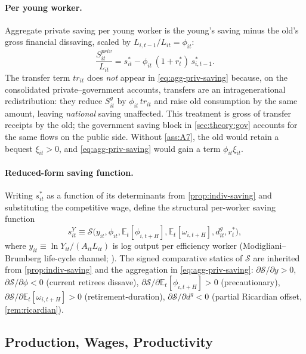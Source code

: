 \paragraph{Per young worker.} Aggregate private saving per young worker is the
young's saving minus the old's gross financial dissaving, scaled by $L_{i,t-1}/L_{it}=\phi_{it}$:
\begin{equation}
\frac{S_{it}^{priv}}{L_{it}}=s_{it}^*-\phi_{it}\,(1+r_t^*)\,s_{i,t-1}^*.
\label{eq:agg-priv-saving}
\end{equation}
The transfer term $tr_{it}$ does \emph{not} appear in \eqref{eq:agg-priv-saving}
because, on the consolidated private--government accounts, transfers are an
intragenerational redistribution: they reduce $S_{it}^g$ by $\phi_{it}\,tr_{it}$
and raise old consumption by the same amount, leaving \emph{national} saving
unaffected. This treatment is gross of transfer receipts by the old; the
government saving block in \cref{sec:theory:gov} accounts for the same flows
on the public side. Without \cref{ass:A7}, the old would retain a bequest
$\xi_{it}>0$, and \eqref{eq:agg-priv-saving} would gain a term
$\phi_{it}\xi_{it}$.

\paragraph{Reduced-form saving function.} Writing $s_{it}^*$ as a function of
its determinants from \cref{prop:indiv-saving} and substituting the competitive
wage, define the structural per-worker saving function
\begin{equation}
s_{it}^Y\equiv\mathcal{S}\bigl(y_{it},\phi_{it},\mathbb{E}_t[\phi_{i,t+H}],\mathbb{E}_t[\omega_{i,t+H}],d_{it}^g,r_t^*\bigr),
\label{eq:S-function}
\end{equation}
where $y_{it}\equiv \ln Y_{it}/(A_{it}L_{it})$ is log output per efficiency
worker (Modigliani--Brumberg life-cycle channel; \citealp{ModiglianiBrumberg1954,Feldstein1980}).
The signed comparative statics of $\mathcal{S}$ are inherited from
\cref{prop:indiv-saving} and the aggregation in \eqref{eq:agg-priv-saving}:
$\partial\mathcal{S}/\partial y>0$, $\partial\mathcal{S}/\partial\phi<0$
(current retirees dissave), $\partial\mathcal{S}/\partial \mathbb{E}_t[\phi_{i,t+H}]>0$
(precautionary), $\partial\mathcal{S}/\partial \mathbb{E}_t[\omega_{i,t+H}]>0$
(retirement-duration), $\partial\mathcal{S}/\partial d^g<0$ (partial Ricardian
offset, \cref{rem:ricardian}).

\subsection{Production, Wages, Productivity}\label{sec:theory:production}

